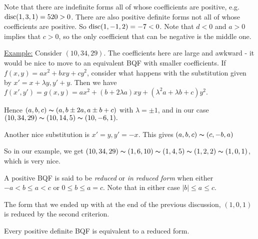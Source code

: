 \documentclass[10pt,a4paper]{article}
\begin{document}
Note that there are indefinite forms all of whose coefficients are positive, e.g. $\operatorname{disc}(1,3,1) = 520 > 0$. There are also positive definite forms not all of whose coefficients are positive. So $\operatorname{disc}(1,-1,2) = -7 < 0$. Note that $d < 0$ and $a>0$ implies that $c>0$, so the only coefficient that can be negative is the middle one.

\underline{Example:} Consider $(10,34,29)$. The coefficients here are large and awkward - it would be nice to move to an equivalent BQF with smaller coefficients. If $f(x,y) = ax^2 + bxy + cy^2$, consider what happens with the substitution given by $x' = x+ \lambda y, y' + y$. Then we have $f(x', y') = g(x, y) = ax^2 + (b+2\lambda a) xy + (\lambda^2a + \lambda b +c)y^2.$

Hence $(a,b,c) \thicksim (a, b\pm 2a, a\pm b + c)$ with $\lambda = \pm 1$, and in our case $(10, 34, 29) \thicksim (10, 14, 5) \thicksim (10,-6,1).$

Another nice substitution is $x' = y, y' = -x$. This gives $(a,b,c) \thicksim (c, -b, a)$

So in our example, we get $(10, 34, 29) \thicksim (1, 6, 10) \thicksim (1, 4, 5) \thicksim (1, 2, 2) \thicksim (1, 0, 1)$, which is very nice. 

A positive BQF is said to be \emph{reduced} or \emph{in reduced form} when either $-a < b \leq a < c$ or $0 \leq b \leq a = c$. Note that in either case $|b| \leq a \leq c$.

The form that we ended up with at the end of the previous discussion, $(1,0,1)$ is reduced by the second criterion.

\begin{proposition}
Every positive definite BQF is equivalent to a reduced form.
\end{proposition}
\end{document}
